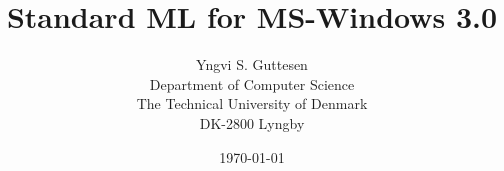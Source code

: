 \newenvironment{descit}[1]{\begin{quote}{\em #1\/}:}{\end{quote}}
\title{Standard ML for MS-Windows 3.0}
\author{
 Yngvi S. Guttesen \\
 Department of Computer Science \\
 The Technical University of Denmark \\
 DK-2800 Lyngby}
\date{\today}
\pagestyle{headings}

\maketitle











